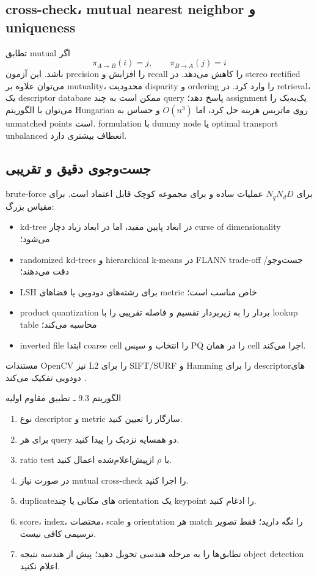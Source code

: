 \documentclass[12pt,openany,oneside]{book}
\begin{document}
\subsection{cross-check، mutual nearest neighbor و uniqueness}
تطابق mutual اگر
\begin{equation}
\pi_{A\to B}(i)=j,\qquad \pi_{B\to A}(j)=i
\end{equation}
باشد. این آزمون precision را افزایش و recall را کاهش می‌دهد. در stereo rectified می‌توان علاوه بر mutuality، محدودیت disparity و ordering را وارد کرد.
در retrieval، یک descriptor database ممکن است به چند query پاسخ دهد؛ assignment یک‌به‌یک را می‌توان با الگوریتم Hungarian روی ماتریس هزینه حل کرد، اما
$O(n^3)$ و حساس به unmatched points است. formulation با dummy node یا optimal transport unbalanced انعطاف بیشتری دارد.

\subsection{جست‌وجوی دقیق و تقریبی}
brute-force برای $N_qN_dD$ عملیات ساده و برای مجموعه کوچک قابل اعتماد است. برای مقیاس بزرگ:
\begin{itemize}
\item kd-tree در ابعاد پایین مفید، اما در ابعاد زیاد دچار curse of dimensionality می‌شود؛
\item randomized kd-trees و hierarchical k-means در FLANN trade-off جست‌وجو/دقت می‌دهند؛
\item LSH برای رشته‌های دودویی یا فضاهای metric خاص مناسب است؛
\item product quantization بردار را به زیر‌بردار تقسیم و فاصله تقریبی را با lookup table محاسبه می‌کند؛
\item inverted file ابتدا coarse cell را انتخاب و سپس PQ را در همان cell اجرا می‌کند.
\end{itemize}
مستندات OpenCV نیز L2 را برای SIFT/SURF و Hamming را برای descriptorهای دودویی تفکیک می‌کند \cite{opencvfeatures2026}.

\begin{algorithmbox}{الگوریتم 9.3 ـ تطبیق مقاوم اولیه}
\begin{enumerate}
\item نوع descriptor و metric سازگار را تعیین کنید.
\item برای هر query دو همسایه نزدیک را پیدا کنید.
\item ratio test با $\rho$ ازپیش‌اعلام‌شده اعمال کنید.
\item در صورت نیاز mutual cross-check را اجرا کنید.
\item duplicateهای مکانی یا چند orientation یک keypoint را ادغام کنید.
\item score، index، مختصات، scale و orientation هر match را نگه دارید؛ فقط تصویر ترسیمی کافی نیست.
\item تطابق‌ها را به مرحله هندسی تحویل دهید؛ پیش از هندسه نتیجه object detection اعلام نکنید.
\end{enumerate}
\end{algorithmbox}
\end{document}
